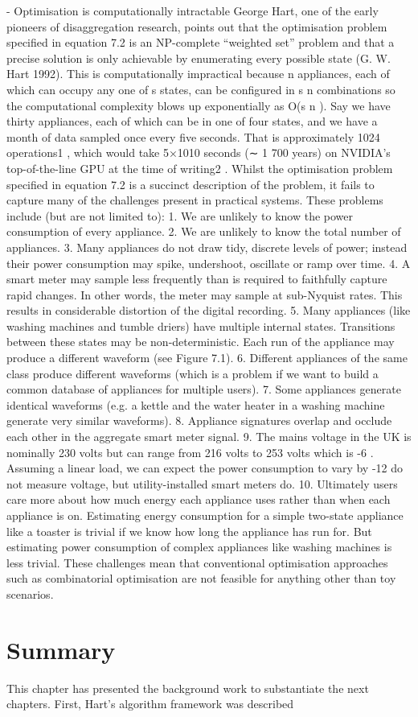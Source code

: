 - Optimisation is computationally intractable
George Hart, one of the early pioneers of disaggregation research, points out that the optimisation
problem specified in equation 7.2 is an NP-complete “weighted set” problem and that
a precise solution is only achievable by enumerating every possible state (G. W. Hart 1992).
This is computationally impractical because n appliances, each of which can occupy any one
of s states, can be configured in s
n
combinations so the computational complexity blows up
exponentially as O(s
n
). Say we have thirty appliances, each of which can be in one of four
states, and we have a month of data sampled once every five seconds. That is approximately
1024 operations1
, which would take 5×1010 seconds (∼ 1 700 years) on NVIDIA’s top-of-the-line
GPU at the time of writing2
.
Whilst the optimisation problem specified in equation 7.2 is a succinct description of the problem,
it fails to capture many of the challenges present in practical systems. These problems
include (but are not limited to):
1. We are unlikely to know the power consumption of every appliance.
2. We are unlikely to know the total number of appliances.
3. Many appliances do not draw tidy, discrete levels of power; instead their power consumption
may spike, undershoot, oscillate or ramp over time.
4. A smart meter may sample less frequently than is required to faithfully capture rapid
changes. In other words, the meter may sample at sub-Nyquist rates. This results in
considerable distortion of the digital recording.
5. Many appliances (like washing machines and tumble driers) have multiple internal states.
Transitions between these states may be non-deterministic. Each run of the appliance
may produce a different waveform (see Figure 7.1).
6. Different appliances of the same class produce different waveforms (which is a problem if
we want to build a common database of appliances for multiple users).
7. Some appliances generate identical waveforms (e.g. a kettle and the water heater in a
washing machine generate very similar waveforms).
8. Appliance signatures overlap and occlude each other in the aggregate smart meter signal.
9. The mains voltage in the UK is nominally 230 volts but can range from 216 volts to
253 volts which is -6%
. Assuming a linear
load, we can expect the power consumption to vary by -12%
do not measure voltage, but utility-installed smart meters do.
10. Ultimately users care more about how much energy each appliance uses rather than when
each appliance is on. Estimating energy consumption for a simple two-state appliance
like a toaster is trivial if we know how long the appliance has run for. But estimating
power consumption of complex appliances like washing machines is less trivial.
These challenges mean that conventional optimisation approaches such as combinatorial optimisation
are not feasible for anything other than toy scenarios.


\fi

\section{Summary}
This chapter has presented the background work to substantiate the next chapters. First, Hart's algorithm framework was described 